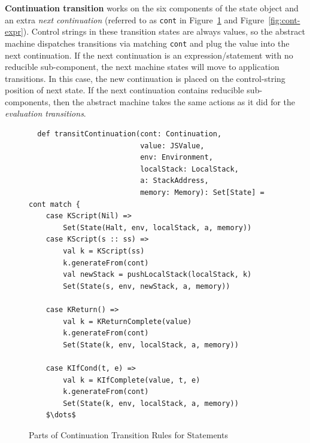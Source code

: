 \documentclass[12pt]{report}
\begin{document}
\textbf{Continuation transition} works on the six components of the state object and an extra \emph{next continuation} (referred to as \verb|cont| in Figure~\ref{fig:cont-stmt} and Figure~\ref{fig:cont-expr}).
Control strings in these transition states are always values, so the abstract machine dispatches transitions via matching \verb|cont| and plug the value into the next continuation.
If the next continuation is an expression/statement with no reducible sub-component, the next machine states will move to application transitions.
In this case, the new continuation is placed on the control-string position of next state.
If the next continuation contains reducible sub-components, then the abstract machine takes the same actions
as it did for the {\em evaluation transitions}.

\begin{figure}
\lstset{language=Scala, mathescape}
\begin{lstlisting}
  def transitContinuation(cont: Continuation,
                          value: JSValue,
                          env: Environment,
                          localStack: LocalStack,
                          a: StackAddress,
                          memory: Memory): Set[State] = cont match {
    case KScript(Nil) =>
        Set(State(Halt, env, localStack, a, memory))
    case KScript(s :: ss) =>
        val k = KScript(ss)
        k.generateFrom(cont)
        val newStack = pushLocalStack(localStack, k)
        Set(State(s, env, newStack, a, memory))

    case KReturn() =>
        val k = KReturnComplete(value)
        k.generateFrom(cont)
        Set(State(k, env, localStack, a, memory))

    case KIfCond(t, e) =>
        val k = KIfComplete(value, t, e)
        k.generateFrom(cont)
        Set(State(k, env, localStack, a, memory))
    $\dots$
\end{lstlisting}
\caption{Parts of Continuation Transition Rules for Statements}
\label{fig:cont-stmt}
\end{figure}
\end{document}

